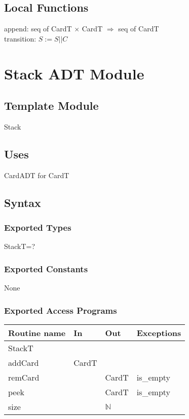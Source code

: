 \documentclass[12pt]{article}
\newcommand{\means}{\Rightarrow}
\begin{document}
\subsection*{Local Functions}

\noindent append: seq of CardT $\times$ CardT $\means$ seq of CardT\\
\noindent transition: $S := S||C$

\newpage

\section*{Stack ADT Module}

\subsection*{Template Module}

Stack

\subsection*{Uses}

CardADT for CardT\\

\subsection*{Syntax}

\subsubsection*{Exported Types}

StackT=?

\subsubsection*{Exported Constants}

None

\subsubsection*{Exported Access Programs}

\begin{tabular}{| l | l | l | l |}
    \hline
    \textbf{Routine name} & \textbf{In} & \textbf{Out} & \textbf{Exceptions}\\
    \hline
    StackT & ~ & ~ & ~\\
    \hline
    addCard & CardT & ~ & ~\\
    \hline
    remCard & ~ & CardT & is\_empty\\
    \hline
    peek & ~ & CardT & is\_empty\\
    \hline
    size & ~ & $\mathbb{N}$ & ~\\
    \hline
\end{tabular}
\end{document}
